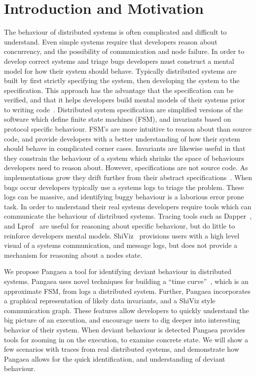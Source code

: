 \section{Introduction and Motivation}
\label{sec:intro}

The behaviour of distributed systems is often complicated and
difficult to understand. Even simple systems require that developers
reason about concurrency, and the possibility of communication and
node failure. In order to develop correct systems and triage bugs
developers must construct a mental model for how their system should
behave. Typically distributed systems are built by first strictly
specifying the system, then developing the system to the
specification. This approach has the advantage that the specification
can be verified, and that it helps developers build mental models of
their systems prior to writing
code~\cite{Newcombe:2015:AWS:2749359.2699417,WilcoxWPTWEA2015}.
Distributed system specification are simplified versions of the
software which define finite state machines (FSM), and invariants
based on protocol specific behaviour. FSM's are more intuitive to
reason about than source code, and provide developers with a better
understanding of how their system should behave in complicated corner
cases. Invariants are likewise useful in that they constrain the
behaviour of a system which shrinks the space of behaviours developers
need to reason about. However, specifications are not source code. As
implementations grow they drift further from their abstract
specifications~\cite{917525}. When bugs occur developers typically use
a systems logs to triage the problem. These logs can be massive, and
identifying buggy behaviour is a laborious error prone task.  In order
to understand their real systems developers require tools which can
communicate the behaviour of distribued systems. Tracing tools such as
Dapper~\cite{36356}, and Lprof~\cite{Zhao:2014:LNR:2685048.2685099}
are useful for reasoning about specific behaviour, but do little to
reinforce developers mental models. ShiViz~\cite{BeschastnikhWBE2016}
provisions users with a high level visual of a systems communication,
and message logs, but does not provide a mechanism for reasoning about
a nodes state. 

We propose Pangaea a tool for identifying deviant behaviour in
distributed systems. Pangaea uses novel techniques for building a
``time curve''~\cite{Bach2015timecurves}, which is an approximate FSM,
from logs a distributed system. Further, Pangaea incorporates a
graphical representation of likely data invariants, and a ShiViz style
communication graph.  These features allow developers to quickly
understand the big picture of an execution, and encourage users to dig
deeper into interesting behavior of their system.  When deviant
behaviour is detected Pangaea provides tools for zooming in on the
execution, to examine concrete state.  We will show a few scenarios
with traces from real distributed systems, and demonstrate how Pangaea
allows for the quick identification, and understanding of deviant
behaviour.

